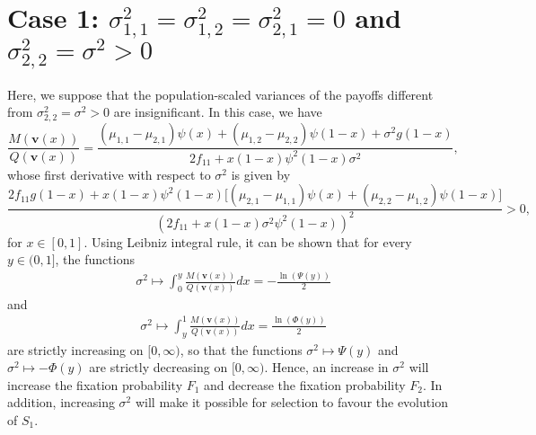 \documentclass[11pt]{article}
\begin{document}

\section{Case 1: $\sigma^2_{1,1}=\sigma^2_{1,2}=\sigma^2_{2,1}=0$ and $\sigma^2_{2,2}=\sigma^2>0$}
Here, we suppose that the population-scaled variances of the payoffs different from $\sigma^2_{2,2}=\sigma^2>0$ are insignificant. In this case, we have 
\begin{equation}\label{sec5-case1-eq0}
\frac{M(\mathbf{v}(x))}{Q(\mathbf{v}(x))}=\frac{(\mu_{1,1}-\mu_{2,1})\psi(x)+(\mu_{1,2}-\mu_{2,2})\psi(1-x)+\sigma^2g(1-x)}{2f_{11}+x(1-x)\psi^2(1-x)\sigma^2},
\end{equation}
whose first derivative with respect to $\sigma^2$ is given by
\begin{equation}
\frac{2f_{11}g(1-x)+x(1-x)\psi^2(1-x)\Big[(\mu_{2,1}-\mu_{1,1})\psi(x)+(\mu_{2,2}-\mu_{1,2})\psi(1-x)\Big]}
{\left(2f_{11}+x(1-x)\sigma^2\psi^2(1-x)\right)^2}>0,
\end{equation}
for $x\in[0,1]$. 
Using Leibniz integral rule, it can be shown that for every $y\in(0,1]$, the functions 
\begin{align}
\sigma^2\longmapsto\int_{0}^{y}\frac{M(\mathbf{v}(x))}{Q(\mathbf{v}(x))}dx=-\frac{\ln(\Psi(y))}{2}
\end{align}
and 
\begin{align}
\sigma^2\longmapsto\int_{y}^{1}\frac{M(\mathbf{v}(x))}{Q(\mathbf{v}(x))}dx=\frac{\ln(\Phi(y))}{2}
\end{align}
 are strictly increasing on $[0,\infty)$, so that the functions $\sigma^2\longmapsto\Psi(y)$  and $\sigma^2\longmapsto -\Phi(y)$ are strictly 
 decreasing on $[0,\infty)$. %
 Hence, an increase in $\sigma^2$ will increase the fixation probability $F_1$ and decrease the fixation probability $F_2$. In addition, increasing $\sigma^2$ will make it possible for selection to favour the evolution of $S_1$.
\end{document}
